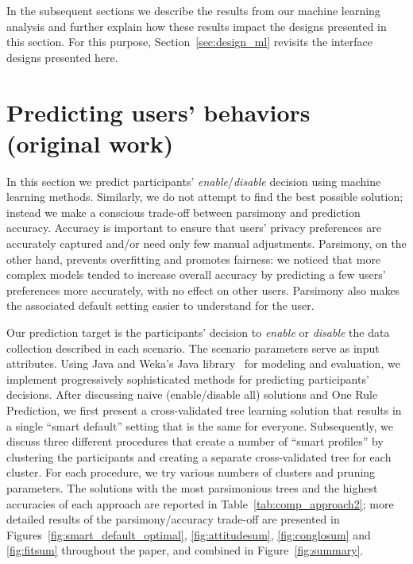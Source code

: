 In the subsequent sections we describe the results from our machine learning analysis and further explain how these results impact the designs presented in this section. For this purpose, Section~\ref{sec:design_ml} revisits the interface designs presented here.

\section{Predicting users' behaviors (original work)}\label{sec:predict}
In this section we predict participants' \textit{enable}/\textit{disable} decision using machine learning methods. Similarly, we do not attempt to find the best possible solution; instead we make a conscious trade-off between parsimony and prediction accuracy. Accuracy is important to ensure that users' privacy preferences are accurately captured and/or need only few manual adjustments. Parsimony, on the other hand, prevents overfitting and promotes fairness: we noticed that more complex models tended to increase overall accuracy by predicting a few users' preferences more accurately, with no effect on other users. Parsimony also makes the associated default setting easier to understand for the user.


Our prediction target is the participants' decision to \textit{enable} or \textit{disable} the data collection described in each scenario. The scenario parameters serve as input attributes. Using Java and Weka's Java library~\cite{witten2016data} for modeling and evaluation, we implement progressively sophisticated methods for predicting participants' decisions. After discussing naive (enable/disable all) solutions and One Rule Prediction, we first present a cross-validated tree learning solution that results in a single ``smart default'' setting that is the same for everyone. Subsequently, we discuss three different procedures that create a number of ``smart profiles'' by clustering the participants and creating a separate cross-validated tree for each cluster. For each procedure, we try various numbers of clusters and pruning parameters. The solutions with the most parsimonious trees and the highest accuracies of each approach are reported in Table~\ref{tab:comp_approach2}; more detailed results of the parsimony/accuracy trade-off are presented in Figures~\ref{fig:smart_default_optimal}, \ref{fig:attitudesum}, \ref{fig:conglosum} and \ref{fig:fitsum} throughout the paper, and combined in Figure~\ref{fig:summary}.


